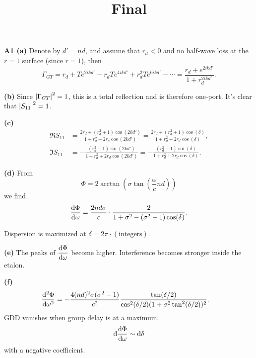 \documentclass{article}
\title{Final}
\author{}
\makeatletter
\newcommand*{\shifttext}[1]{%
  \settowidth{\@tempdima}{#1}%
  \hspace{-\@tempdima}#1%
}
\newcommand{\plabel}[1]{%
\shifttext{\textbf{#1}\quad}%
}
\newcommand{\minusbaseline}{\abovedisplayskip=0pt\abovedisplayshortskip=0pt~\vspace*{-\baselineskip}}%
\makeatother
\begin{document}
\maketitle

\plabel{A1 (a)}%
Denote by $d' = n d$, and assume that $r_d<0$ and no half-wave loss at the $r=1$ surface (since $r=1$), then
\[ \Gamma_{GT} = r_d + T e^{2ikd'} - r_d T e^{4ikd'} + r_d^2 T e^{6ikd'} - \cdots = \frac{r_d+e^{2ikd'}}{1+r_d^{2ikd'}}. \]

\plabel{(b)}%
Since $\abs{\Gamma_{GT}}^2 = 1$, this is a total reflection and is therefore one-port.
It's clear that $\abs{S_{11}}^2 = 1$.

\plabel{(c)}%
\begingroup\minusbaseline
\begin{align*}
    \Re S_{11} &= \frac{2 r_d + \left(r_d^2+1\right) \cos (2 k d')}{1+r_d^2 + 2 r_d \cos (2 k d')} = \frac{2 r_d + \left(r_d^2+1\right) \cos (\delta)}{1+r_d^2 + 2 r_d \cos (\delta)}, \\
    \Im S_{11} &= -\frac{\left(r_d^2-1\right) \sin (2 k d')}{1+r_d^2+2 r_d \cos (2 k d')} = -\frac{\left(r_d^2-1\right) \sin (\delta)}{1+r_d^2+2 r_d \cos (\delta)}.
\end{align*}
\endgroup

\plabel{(d)}%
From
\[ \Phi = 2\arctan(\sigma\tan(\frac{\omega}{c} n d)) \]
we find
\[ \dv{\Phi}{\omega} = \frac{2 n d \sigma}{c} \cdot \frac{2}{1+\sigma^2 - (\sigma^2 - 1)\cos(\delta)}. \]
\begin{center}
\end{center}
Dispersion is maximized at $\delta = 2 \pi \cdot (\text{integers})$.

\plabel{(e)}%
The peaks of $\displaystyle\dv{\Phi}{\omega}$ become higher.
Interference becomes stronger inside the etalon.

\plabel{(f)}%
\begingroup\minusbaseline
\begin{align*}
    \dv[2]{\Phi}{\omega} &= -\frac{4(nd)^2\sigma(\sigma^2-1)}{c^2} \frac{\tan(\delta/2)}{\cos^2(\delta/2)(1+\sigma^2 \tan^2(\delta/2))^2}.
\end{align*}
\endgroup
GDD vanishes when group delay is at a maximum.
\[ \dd{\dv{\Phi}{\omega}} \sim \dd{\delta} \]
with a negative coefficient.
\end{document}
